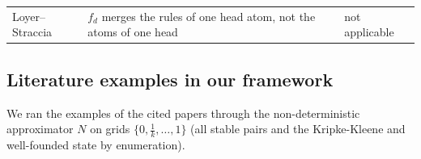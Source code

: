 {\begin{longtable}{@{}p{}p{}p{}@{}}
            Loyer--Straccia \cite{LoyerS02}                                                                                                                                                      & $f_d$ merges the rules of one head atom, not the atoms of one head                                                                                            & not applicable                                                                      \\
        \end{longtable}
    }

\subsection*{Literature examples in our framework}
We ran the examples of the cited papers through the non-deterministic approximator $N$ on grids $\{0,\frac1k,\dots,1\}$ (all stable pairs and the Kripke-Kleene and well-founded state by enumeration).

